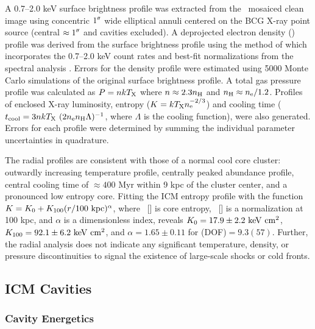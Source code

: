 \documentclass[iop]{emulateapj}
\begin{document}
A 0.7--2.0 keV surface brightness profile was extracted from the
\cxo\ mosaiced clean image using concentric $1\rm{^\prime}\hskip -0.1em\rm{^\prime}$ wide elliptical
annuli centered on the BCG X-ray point source (central $\approx
1\rm{^\prime}\hskip -0.1em\rm{^\prime}$ and cavities excluded). A deprojected electron density
(\nelec) profile was derived from the surface brightness profile using
the method of \citet{kriss83} which incorporates the 0.7--2.0 keV
count rates and best-fit normalizations from the spectral analysis
\citep[see][for details]{accept}. Errors for the density profile were
estimated using 5000 Monte Carlo simulations of the original surface
brightness profile. A total gas pressure profile was calculated as $P
= n kT_{\rm{X}}$ where $n \approx 2.3 n_{\rm{H}}$ and $n_{\rm{H}} \approx
n_{\rm{e}}/1.2$. Profiles of enclosed X-ray luminosity, entropy ($K = kT_{\rm{X}}
n_{\rm{e}}^{-2/3}$) and cooling time ($t_{\rm{cool}} = 3 n kT_{\rm{X}}~(2 n_{\rm{e}} n_{\rm{H}}
\Lambda)^{-1}$, where $\Lambda$ is the cooling function), were also
generated. Errors for each profile were determined by summing the
individual parameter uncertainties in quadrature.

The radial profiles are consistent with those of a normal cool core
cluster: outwardly increasing temperature profile, centrally peaked
abundance profile, central cooling time of $\approx 400$ Myr within 9
kpc of the cluster center, and a pronounced low entropy core. Fitting
the ICM entropy profile with the function $K = K_0 +K_{100} (r/100
~\mbox{\ensuremath{\rm{kpc}}})^{\alpha}$, where \kna\ [\ent] is core entropy, \khun\ [\ent] is
a normalization at 100 kpc, and $\alpha$ is a dimensionless index,
reveals $K_0 = 17.9 \pm 2.2 ~\rm{\mbox{\ensuremath{\rm{keV}}}~\ensuremath{\rm{\mbox{\ensuremath{\rm{cm}}}^2}}}$, $K_{100} = 92.1 \pm 6.2 ~\rm{\mbox{\ensuremath{\rm{keV}}}~\ensuremath{\rm{\mbox{\ensuremath{\rm{cm}}}^2}}}$, and
$\alpha = 1.65 \pm 0.11$ for \chisq(DOF)$ = 9.3(57)$. Further, the
radial analysis does not indicate any significant temperature,
density, or pressure discontinuities to signal the existence of
large-scale shocks or cold fronts.

\subsection{ICM Cavities}
\label{sec:cavities}

\subsubsection{Cavity Energetics}
\label{sec:ecav}
\end{document}
